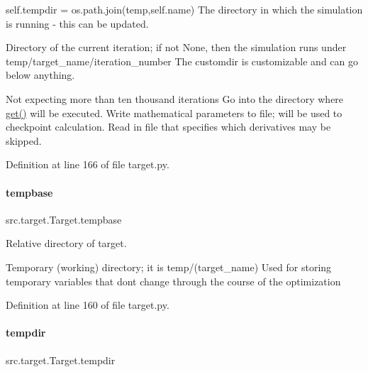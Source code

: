 self.\+tempdir = os.\+path.\+join(\textquotesingle{}temp\textquotesingle{},self.\+name) The directory in which the simulation is running -\/ this can be updated. 

Directory of the current iteration; if not None, then the simulation runs under temp/target\+\_\+name/iteration\+\_\+number The \textquotesingle{}customdir\textquotesingle{} is customizable and can go below anything.

Not expecting more than ten thousand iterations Go into the directory where \hyperlink{classsrc_1_1target_1_1Target_a8cdd102607c4ed610c0e1ec50e91452d}{get()} will be executed. Write mathematical parameters to file; will be used to checkpoint calculation. Read in file that specifies which derivatives may be skipped. 

Definition at line 166 of file target.\+py.

\mbox{\label{classsrc_1_1target_1_1Target_ae182b033fbe054ff2daa7659e69a7957}} 
\paragraph{\texorpdfstring{tempbase}{tempbase}}
{\footnotesize\ttfamily src.\+target.\+Target.\+tempbase}



Relative directory of target. 

Temporary (working) directory; it is temp/(target\+\_\+name) Used for storing temporary variables that don\textquotesingle{}t change through the course of the optimization 

Definition at line 160 of file target.\+py.

\mbox{\label{classsrc_1_1target_1_1Target_a7cc95b1ec34fa75172c81469ff6e5d1d}} 
\paragraph{\texorpdfstring{tempdir}{tempdir}}
{\footnotesize\ttfamily src.\+target.\+Target.\+tempdir}



